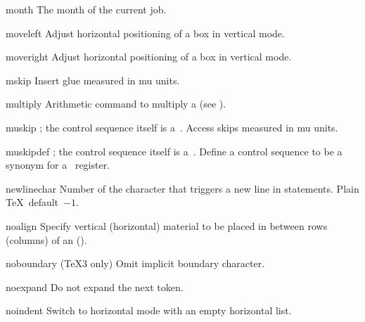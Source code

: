 \item month
      The month of the current job.

\item moveleft
      Adjust horizontal positioning of a box in vertical mode. 

\item moveright
      Adjust horizontal positioning of a box in vertical mode. 

\item mskip
      Insert glue measured in mu units.

\item multiply
      Arithmetic command to multiply a
       (see ).

\item muskip
      ; the control sequence itself
      is a~.
      Access skips measured in mu units. 

\item muskipdef
      ; the control sequence
      itself is a~.
      Define a control sequence to be a synonym for
      a~ register.

\item newlinechar
      Number of the character that triggers a new line in
       statements.
      Plain \TeX\ default~$-1$.
      
\item noalign\lb{}\rb
      Specify  vertical (horizontal)
      material   to be placed in between rows (columns) of
      an  ().

\item noboundary
      (\TeX3 only)
      Omit implicit boundary character.

\item noexpand
      Do not expand the next token.

\item noindent 
      Switch to horizontal mode with an empty horizontal list.

